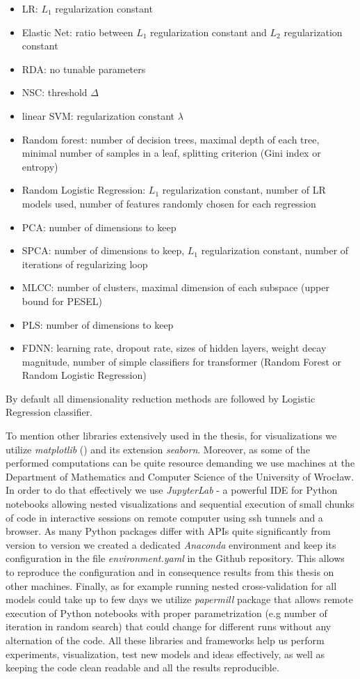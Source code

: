 \documentclass[shortabstract, english, mgr]{iithesis}
\begin{document}
\begin{itemize}
    \item LR: $L_1$ regularization constant
    \item Elastic Net: ratio between $L_1$ regularization constant and $L_2$ regularization constant
    \item RDA: no tunable parameters
    \item NSC: threshold $\Delta$
    \item linear SVM: regularization constant $\lambda$
    \item Random forest: number of decision trees, maximal depth of each tree, minimal number of samples in a leaf, splitting criterion (Gini index or entropy)
    \item Random Logistic Regression: $L_1$ regularization constant, number of LR models used, number of features randomly chosen for each regression 
    \item PCA: number of dimensions to keep
    \item SPCA: number of dimensions to keep, $L_1$ regularization constant, number of iterations of regularizing loop
    \item MLCC: number of clusters, maximal dimension of each subspace (upper bound for PESEL)
    \item PLS: number of dimensions to keep
    \item FDNN: learning rate, dropout rate, sizes of hidden layers, weight decay magnitude, number of simple classifiers for transformer (Random Forest or Random Logistic Regression)
\end{itemize}
By default all dimensionality reduction methods are followed by Logistic Regression classifier. 

To mention other libraries extensively used in the thesis, for visualizations we utilize \textit{matplotlib} (\cite{matplotlib}) and its extension \textit{seaborn}. Moreover, as some of the performed computations can be quite resource demanding we use machines at the Department of Mathematics and Computer Science of the University of Wrocław. In order to do that effectively we use \textit{JupyterLab} - a powerful IDE for Python notebooks allowing nested visualizations and sequential execution of small chunks of code in interactive sessions on remote computer using ssh tunnels and a browser. As many Python packages differ with APIs quite significantly from version to version we created a dedicated \textit{Anaconda} environment and keep its configuration in the file \textit{environment.yaml} in the Github repository. This allows to reproduce the configuration and in consequence results from this thesis on other machines. Finally, as for example running nested cross-validation for all models could take up to few days we utilize \textit{papermill} package that allows remote execution of Python notebooks with proper parametrization (e.g number of iteration in random search) that could change for different runs without any alternation of the code. All these libraries and frameworks help us perform experiments, visualization, test new models and ideas effectively, as well as keeping the code clean readable and all the results reproducible. 
\end{document}
